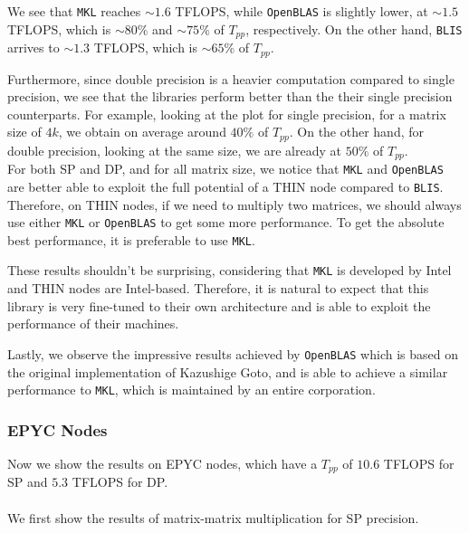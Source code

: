 \documentclass{report}
\begin{document}
We see that \texttt{MKL} reaches $\sim1.6$ TFLOPS, 
while \texttt{OpenBLAS} is slightly lower, at $\sim1.5$ TFLOPS, which is $\sim80\%$ and 
$\sim75\%$ of $T_{pp}$, respectively. On the other hand, \texttt{BLIS} arrives to 
$\sim1.3$ TFLOPS, which is $\sim65\%$ of $T_{pp}$.

Furthermore, since double precision is a heavier computation compared to single 
precision, we see that the libraries perform better than the their single precision 
counterparts.
For example, looking at the plot for single precision, for a matrix size of $4k$, 
we obtain on average around $40\%$ of $T_{pp}$. On the other hand, for double precision, 
looking at the same size, we are already at $50\%$ of $T_{pp}$.
\\

For both SP and DP, and for all matrix size, we notice that \texttt{MKL} and 
\texttt{OpenBLAS} are better able to exploit the full potential of a THIN node 
compared to \texttt{BLIS}. Therefore, on THIN nodes, if we need to multiply 
two matrices, we should always use either \texttt{MKL} or \texttt{OpenBLAS} to 
get some more performance. To get the absolute best performance, it is preferable 
to use \texttt{MKL}.

These results shouldn't be surprising, considering 
that \texttt{MKL} is developed by Intel and THIN nodes are Intel-based.
Therefore, it is natural to expect that this library is very fine-tuned to 
their own architecture and is able to exploit the performance of their machines.

Lastly, we observe the impressive results achieved by \texttt{OpenBLAS} which 
is based on the original implementation of Kazushige Goto, and is able to achieve a similar performance to 
\texttt{MKL}, which is maintained by an entire corporation.

\subsubsection{EPYC Nodes}

Now we show the results on EPYC nodes, which have a $T_{pp}$ of $10.6$ TFLOPS 
for SP and $5.3$ TFLOPS for DP.
\\\\
We first show the results of matrix-matrix multiplication for SP 
precision.
\end{document}
